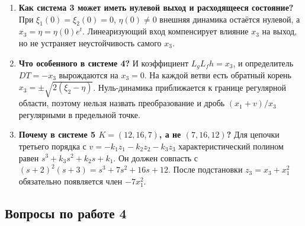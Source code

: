 \begin{enumerate}[resume]
\item \textbf{Как система 3 может иметь нулевой выход и расходящееся состояние?}
При $\xi_1(0)=\xi_2(0)=0$, $\eta(0)\ne0$ внешняя динамика остаётся нулевой,
а $x_3=\eta=\eta(0)e^t$. Линеаризующий вход компенсирует влияние $x_3$
на выход, но не устраняет неустойчивость самого $x_3$.

\item \textbf{Что особенного в системе 4?}
И коэффициент $L_gL_fh=x_3$, и определитель $DT=-x_3$ вырождаются на
$x_3=0$. На каждой ветви есть обратный корень
$x_3=\pm\sqrt{2(\xi_2-\eta)}$. Нуль-динамика приближается к границе
регулярной области, поэтому нельзя назвать преобразование и дробь
$(x_1+v)/x_3$ регулярными в предельной точке.

\item \textbf{Почему в системе 5 $K=(12,16,7)$, а не $(7,16,12)$?}
Для цепочки третьего порядка с $v=-k_1z_1-k_2z_2-k_3z_3$
характеристический полином равен $s^3+k_3s^2+k_2s+k_1$.
Он должен совпасть с $(s+2)^2(s+3)=s^3+7s^2+16s+12$.
После подстановки $z_3=x_3+x_1^2$ обязательно появляется член $-7x_1^2$.
\end{enumerate}

\subsection{Вопросы по работе 4}

